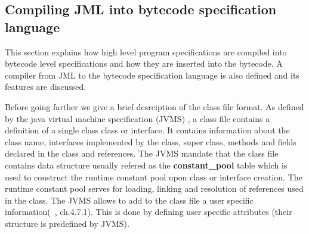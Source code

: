 \subsection{Compiling JML into bytecode specification language}


This section explains how high level program specifications are compiled into bytecode level specifications and how they are inserted into the bytecode. 
 A compiler from JML to the bytecode specification language is also defined and its features are discussed.


Before going farther we give a brief desrciption of the class file format. As defined by the java virtual machine  specification (JVMS) \cite{VMSpec}, a class file contains a definition of a single class class or interface. It contains information about the class name, interfaces implemented by the class, super class, methods and fields declared in the class and references. The JVMS mandate that the class file contains data structure usually refered as the \textbf{constant\_pool} table which is used to construct the runtime constant pool upon class or interface creation. The runtime constant pool serves for loading, linking and resolution of references used in the class. The JVMS allows to add to the class file a user specific information(~\cite{VMSpec}, ch.4.7.1). This is done by defining user specific attributes  (their structure is predefined by JVMS).

